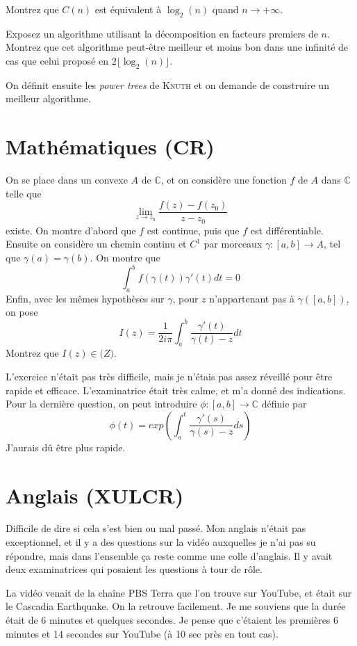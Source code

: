 \documentclass[french,a4paper, 12pt]{article}
\begin{document}
Montrez que $C(n)$ est équivalent à $\log_2(n)$ quand $n\rightarrow +\infty$.

Exposez un algorithme utilisant la décomposition en facteurs premiers de $n$. Montrez que cet algorithme peut-être meilleur et moins bon dans une infinité de cas que celui proposé en $2\lfloor \log_2(n) \rfloor$.

On définit ensuite les \emph{power trees} de \textsc{Knuth} et on demande de construire un meilleur algorithme.

\section*{Mathématiques (CR)}

On se place dans un convexe $A$ de $\mathbb{C}$, et on considère une fonction $f$ de $A$ dans $\mathbb{C}$ telle que $$ \lim_{z\rightarrow z_0}{\frac{f(z) - f(z_0)}{z - z_0}} $$ existe. On montre d'abord que $f$ est continue, puis que $f$ est différentiable. Ensuite on considère un chemin continu et $C^1$ par morceaux $\gamma : [a, b] \rightarrow A$, tel que $\gamma(a) = \gamma(b)$. On montre que $$\int_a^bf(\gamma(t))\gamma'(t)dt = 0$$ Enfin, avec les mêmes hypothèses sur $\gamma$, pour $z$ n'appartenant pas à $\gamma([a, b])$, on pose $$I(z)=\frac{1}{2i\pi}\int_a^b\frac{\gamma'(t)}{\gamma(t)-z}dt$$ Montrez que $I(z)\in\mathbb(Z)$.

L'exercice n'était pas très difficile, mais je n'étais pas assez réveillé pour être rapide et efficace. L'examinatrice était très calme, et m'a donné des indications. Pour la dernière question, on peut introduire $\phi : [a, b] \rightarrow \mathbb{C}$ définie par $$\phi(t) = exp(\int_a^t\frac{\gamma'(s)}{\gamma(s)-z}ds)$$
J'aurais dû être plus rapide.

\section*{Anglais (XULCR)}

Difficile de dire si cela s'est bien ou mal passé. Mon anglais n'était pas exceptionnel, et il y a des questions sur la vidéo auxquelles je n'ai pas su répondre, mais dans l'ensemble ça reste comme une colle d'anglais. Il y avait deux examinatrices qui posaient les questions à tour de rôle.

La vidéo venait de la chaîne PBS Terra que l'on trouve sur YouTube, et était sur le Cascadia Earthquake. On la retrouve facilement. Je me souviens que la durée était de 6 minutes et quelques secondes. Je pense que c'étaient les premières 6 minutes et 14 secondes sur YouTube (à 10 sec près en tout cas).
\end{document}
